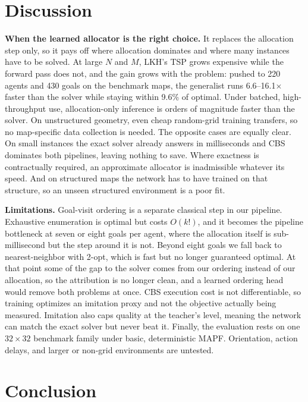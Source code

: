 \documentclass[11pt,a4paper]{article}
\begin{document}
\section{Discussion}

\textbf{When the learned allocator is the right choice.} It replaces the allocation step only, so it
pays off where allocation dominates and where many instances have to be solved. At large $N$ and
$M$, LKH's TSP grows expensive while the forward pass does not, and the gain grows with the
problem: pushed to 220 agents and 430 goals on the benchmark maps, the generalist runs
6.6--16.1$\times$ faster than the solver while staying within 9.6\% of optimal. Under batched,
high-throughput use, allocation-only inference is orders of magnitude faster than the solver. On
unstructured geometry, even cheap random-grid training transfers, so no map-specific data collection
is needed. The opposite cases are equally clear. On small instances the exact solver already answers
in milliseconds and CBS dominates both pipelines, leaving nothing to save. Where exactness is
contractually required, an approximate allocator is inadmissible whatever its speed. And on
structured maps the network has to have trained on that structure, so an unseen structured
environment is a poor fit.

\textbf{Limitations.} Goal-visit ordering is a separate classical step in our pipeline. Exhaustive
enumeration is optimal but costs $O(k!)$, and it becomes the pipeline bottleneck at seven or eight
goals per agent, where the allocation itself is sub-millisecond but the step around it is not.
Beyond eight goals we fall back to nearest-neighbor with 2-opt, which is fast but no longer
guaranteed optimal. At that point some of the gap to the solver comes from our ordering instead of
our allocation, so the attribution is no longer clean, and a learned ordering head would remove both
problems at once. CBS execution cost is
not differentiable, so training optimizes an imitation proxy and not the objective actually being
measured. Imitation also caps quality at the teacher's level, meaning the network can match the exact
solver but never beat it. Finally, the evaluation rests on one $32\times32$ benchmark family under
basic, deterministic MAPF. Orientation, action delays, and larger or non-grid environments are
untested.

\section{Conclusion}
\end{document}
